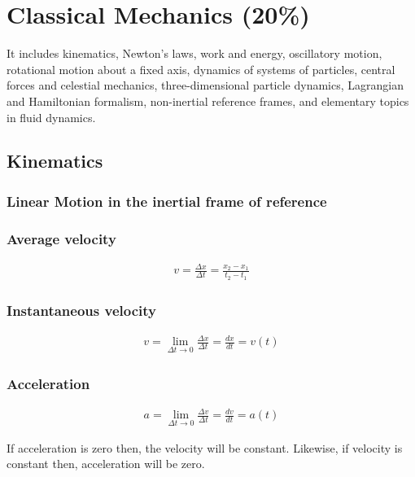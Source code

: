 
\section{Classical Mechanics (20\%)}

It includes kinematics, Newton's laws, work and energy, oscillatory motion, rotational motion about a fixed axis, dynamics of systems of particles, central forces and celestial mechanics, three-dimensional particle dynamics, Lagrangian and Hamiltonian formalism, non-inertial reference frames, and elementary topics in fluid dynamics.

\subsection{Kinematics}

\subsubsection{Linear Motion in the inertial frame of reference}

\subsubsection*{Average velocity}
\begin{align*}
v = \frac{\Delta x}{\Delta t} = \frac{x_{2} - x_{1}}{t_{2} - t_{1}}
\end{align*}

\subsubsection*{Instantaneous velocity}
\begin{align*}
v = \lim_{\Delta t \to 0} \frac{\Delta x}{\Delta t} = \frac{dx}{dt} = v(t)
\end{align*}

\subsubsection*{Acceleration}
\begin{align*}
a = \lim_{\Delta t \to 0} \frac{\Delta v}{\Delta t} = \frac{dv}{dt} = a(t)
\end{align*}

If acceleration is zero then, the velocity will be constant. Likewise, if velocity is constant then, acceleration will be zero.

